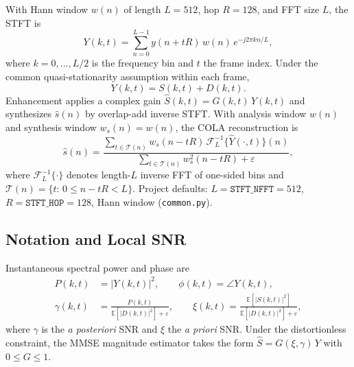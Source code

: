 With Hann window $w(n)$ of length $L=512$, hop $R=128$, and FFT size $L$, the STFT is
\begin{equation}
  Y(k,t) = \sum_{n=0}^{L-1} y(n+tR)\, w(n)\, e^{-j2\pi kn/L},
  \label{eq:stft_def}
\end{equation}
where $k=0,\ldots,L/2$ is the frequency bin and $t$ the frame index. Under the common quasi-stationarity assumption within each frame,
\begin{equation}
  Y(k,t) = S(k,t) + D(k,t).
  \label{eq:stft_mix}
\end{equation}
Enhancement applies a complex gain $\hat{S}(k,t)=G(k,t)\,Y(k,t)$ and synthesizes $\hat{s}(n)$ by overlap-add inverse STFT. With analysis window $w(n)$ and synthesis window $w_s(n)=w(n)$, the COLA reconstruction is
\begin{equation}
  \hat{s}(n) = \frac{\sum_{t\in\mathcal{T}(n)} w_s(n-tR)\, \mathcal{F}^{-1}_L\{\hat{Y}(\cdot,t)\}(n)}
               {\sum_{t\in\mathcal{T}(n)} w_s^2(n-tR) + \varepsilon},
  \label{eq:ola}
\end{equation}
where $\mathcal{F}^{-1}_L\{\cdot\}$ denotes length-$L$ inverse FFT of one-sided bins and $\mathcal{T}(n)=\{t:\,0\le n-tR<L\}$. Project defaults: $L=\texttt{STFT\_NFFT}=512$, $R=\texttt{STFT\_HOP}=128$, Hann window (\texttt{common.py}).

\subsection{Notation and Local SNR}

Instantaneous spectral power and phase are
\begin{align}
  P(k,t) &= |Y(k,t)|^2, \qquad \phi(k,t) = \angle Y(k,t), \\
  \gamma(k,t) &= \frac{P(k,t)}{\mathbb{E}[|D(k,t)|^2] + \varepsilon}, \qquad
  \xi(k,t) = \frac{\mathbb{E}[|S(k,t)|^2]}{\mathbb{E}[|D(k,t)|^2] + \varepsilon},
\end{align}
where $\gamma$ is the \emph{a posteriori} SNR and $\xi$ the \emph{a priori} SNR. Under the distortionless constraint, the MMSE magnitude estimator takes the form $\hat{S}=G(\xi,\gamma)\,Y$ with $0\le G\le 1$.


